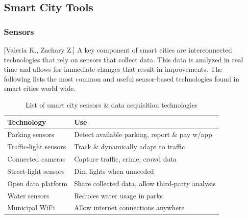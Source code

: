 \documentclass[12pt]{article}                               %
\begin{document}
\subsection{Smart City Tools} 
\subsubsection{Sensors}[Valeria K., Zachary Z.] \label{sec:smart_city_sensors}
A key component of smart cities are interconnected technologies that rely on sensors that collect data. This data is analyzed in real time and allows for immediate changes that result in improvements. The following lists the most common and useful sensor-based technologies found in smart cities world wide. 

\begin{table}[H]
    \centering
    \small
    \begin{tabular}{l|l}
        \textbf{Technology} & \textbf{Use} \\
        \hline{}
        
        Parking sensors &
        Detect available parking, report \& pay w/app \\
        \hline{}
        
        Traffic-light sensors &
        Track \& dynamically adapt to traffic \\
        \hline{}
        
        Connected cameras &
        Capture traffic, crime, crowd data \\
        \hline{}
        
        Street-light sensors &
        Dim lights when unneeded \\
        \hline{}
        
        Open data platform &
        Share collected data, allow third-party analysis \\
        \hline{}
        
        Water sensors &
        Reduces water usage in parks \\
        \hline{}
        
        Municipal WiFi &
        Allow internet connections anywhere
    \end{tabular}
    \caption{List of smart city sensors \& data acquisition technologies}
    \label{tab:smart_city_sensors}
\end{table}
\end{document}
